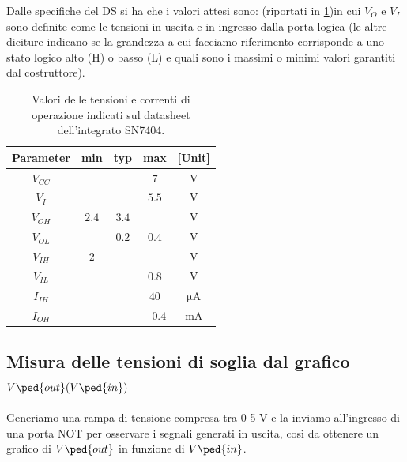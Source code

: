 \documentclass[10pt, a4paper, italian]{article}
\begin{document}
Dalle specifiche del DS si ha che i valori attesi sono: (riportati in
\cref{tab: notDS})in cui $V_O$ e $V_I$ sono definite come le tensioni in uscita e in ingresso
dalla porta logica (le altre diciture indicano se la grandezza a cui facciamo
riferimento corrisponde a uno stato logico alto (H) o basso (L) e quali sono
i massimi o minimi valori garantiti dal costruttore).
\begin{table}[htb]
\centering
\begin{tabular}{cccc|c}
\toprule
Parameter  & min & typ & max & [Unit] \\
\midrule
\midrule
$V_{CC}$ &  &  & $7$ & V \\
$V_I$	 &  &  & $5.5$ & V\\
$V_{OH}$ & $2.4$  & $3.4$ & & V \\
$V_{OL}$ &   & $0.2$ & $0.4$ & V \\
$V_{IH}$ & $2$  &  & & V  \\
$V_{IL}$ &  &  & $0.8$ & V \\
$I_{IH}$ &  &  & $40$ & $\si{\micro\A}$ \\
$I_{OH}$ &  &  & $-0.4$ & mA \\
\bottomrule 
\end{tabular}
\caption{Valori delle tensioni e correnti di operazione indicati sul
datasheet dell'integrato SN7404.}
\label{tab: notDS}
\end{table}
\subsection{Misura delle tensioni di soglia dal grafico
$V\ped{out}(V\ped{in})$}
Generiamo una rampa di tensione compresa tra 0-5 V e la inviamo
all'ingresso di una porta NOT per osservare i segnali generati in uscita,
così da ottenere un grafico di $V\ped{out}$ in funzione di $V\ped{in}$.
\end{document}
